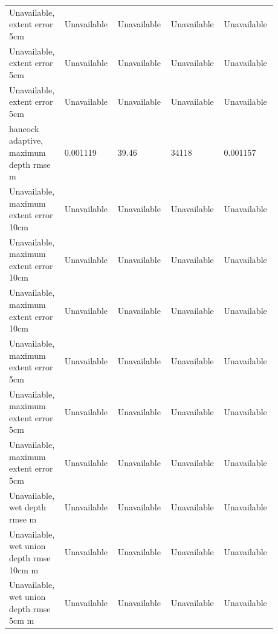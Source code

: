 \begin{longtable}{p{0.1760\linewidth}p{0.1760\linewidth}p{0.1760\linewidth}p{0.1760\linewidth}p{0.1760\linewidth}}
Unavailable, extent error 5cm & Unavailable & Unavailable & Unavailable & Unavailable \\
Unavailable, extent error 5cm & Unavailable & Unavailable & Unavailable & Unavailable \\
Unavailable, extent error 5cm & Unavailable & Unavailable & Unavailable & Unavailable \\
hancock adaptive, maximum depth rmse m & 0.001119 & 39.46 & 34118 & 0.001157 \\
Unavailable, maximum extent error 10cm & Unavailable & Unavailable & Unavailable & Unavailable \\
Unavailable, maximum extent error 10cm & Unavailable & Unavailable & Unavailable & Unavailable \\
Unavailable, maximum extent error 10cm & Unavailable & Unavailable & Unavailable & Unavailable \\
Unavailable, maximum extent error 5cm & Unavailable & Unavailable & Unavailable & Unavailable \\
Unavailable, maximum extent error 5cm & Unavailable & Unavailable & Unavailable & Unavailable \\
Unavailable, maximum extent error 5cm & Unavailable & Unavailable & Unavailable & Unavailable \\
Unavailable, wet depth rmse m & Unavailable & Unavailable & Unavailable & Unavailable \\
Unavailable, wet union depth rmse 10cm m & Unavailable & Unavailable & Unavailable & Unavailable \\
Unavailable, wet union depth rmse 5cm m & Unavailable & Unavailable & Unavailable & Unavailable \\
\end{longtable}
\endgroup
